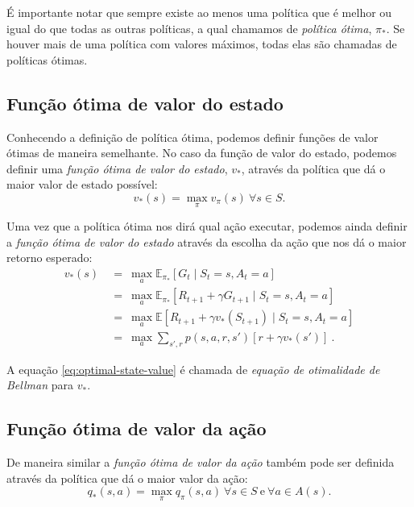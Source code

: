 \documentclass{article}
\begin{document}
            É importante notar que sempre existe ao menos uma política que é melhor ou igual do que todas as outras políticas, a qual chamamos de \emph{política ótima}, $\pi_*$. Se houver mais de uma política com valores máximos, todas elas são chamadas de políticas ótimas.
        
        \subsection{Função ótima de valor do estado}
        
            Conhecendo a definição de política ótima, podemos definir funções de valor ótimas de maneira semelhante. No caso da função de valor do estado, podemos definir uma \emph{função ótima de valor do estado}, $v_*$, através da política que dá o maior valor de estado possível:
            \begin{equation}
                v_*(s) = \max_{\pi} v_{\pi}(s)\ \forall s \in S.
            \end{equation}

            Uma vez que a política ótima nos dirá qual ação executar, podemos ainda definir a \emph{função ótima de valor do estado} através da escolha da ação que nos dá o maior retorno esperado:
            \begin{equation}
            \label{eq:optimal-state-value}
            \begin{split}
                v_*(s) & \ = \ \max_{a} \mathbb{E}_{\pi_*} [G_t \mid S_t = s, A_t = a] \\
                & \ = \ \max_{a} \mathbb{E}_{\pi_*} [R_{t+1} + \gamma G_{t+1} \mid S_t = s, A_t = a] \\
                & \ = \ \max_{a} \mathbb{E} [R_{t+1} + \gamma v_*(S_{t+1}) \mid S_t = s, A_t = a] \\
                & \ = \ \max_{a} \sum_{s', r} p(s, a, r, s') [r + \gamma v_*(s')]\ .
            \end{split}
            \end{equation}

            A equação \eqref{eq:optimal-state-value} é chamada de \emph{equação de otimalidade de Bellman} para $v_*$. 
        
        \subsection{Função ótima de valor da ação}
        
            De maneira similar a \emph{função ótima de valor da ação} também pode ser definida através da política que dá o maior valor da ação:
            \begin{equation}
                q_*(s, a) = \max_{\pi} q_{\pi}(s, a)\ \forall s \in S\ \text{e}\ \forall a \in A(s).
            \end{equation}
\end{document}
